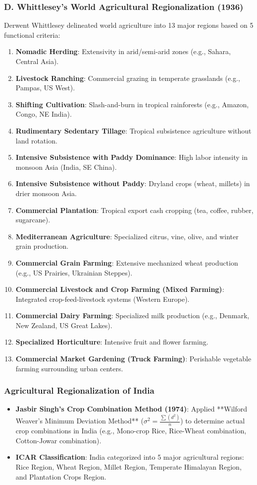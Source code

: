 \documentclass[11pt,a4paper]{article}
\begin{document}
\subsubsection{D. Whittlesey's World Agricultural Regionalization (1936)}
Derwent Whittlesey delineated world agriculture into 13 major regions based on 5 functional criteria:
\begin{enumerate}[leftmargin=*]
  \item \textbf{Nomadic Herding}: Extensivity in arid/semi-arid zones (e.g., Sahara, Central Asia).
  \item \textbf{Livestock Ranching}: Commercial grazing in temperate grasslands (e.g., Pampas, US West).
  \item \textbf{Shifting Cultivation}: Slash-and-burn in tropical rainforests (e.g., Amazon, Congo, NE India).
  \item \textbf{Rudimentary Sedentary Tillage}: Tropical subsistence agriculture without land rotation.
  \item \textbf{Intensive Subsistence with Paddy Dominance}: High labor intensity in monsoon Asia (India, SE China).
  \item \textbf{Intensive Subsistence without Paddy}: Dryland crops (wheat, millets) in drier monsoon Asia.
  \item \textbf{Commercial Plantation}: Tropical export cash cropping (tea, coffee, rubber, sugarcane).
  \item \textbf{Mediterranean Agriculture}: Specialized citrus, vine, olive, and winter grain production.
  \item \textbf{Commercial Grain Farming}: Extensive mechanized wheat production (e.g., US Prairies, Ukrainian Steppes).
  \item \textbf{Commercial Livestock and Crop Farming (Mixed Farming)}: Integrated crop-feed-livestock systems (Western Europe).
  \item \textbf{Commercial Dairy Farming}: Specialized milk production (e.g., Denmark, New Zealand, US Great Lakes).
  \item \textbf{Specialized Horticulture}: Intensive fruit and flower farming.
  \item \textbf{Commercial Market Gardening (Truck Farming)}: Perishable vegetable farming surrounding urban centers.
\end{enumerate}

\subsubsection{Agricultural Regionalization of India}
\begin{itemize}[leftmargin=*]
  \item \textbf{Jasbir Singh's Crop Combination Method (1974)}: Applied **Wilford Weaver's Minimum Deviation Method** ($\sigma^2 = \frac{\sum (d^2)}{n}$) to determine actual crop combinations in India (e.g., Mono-crop Rice, Rice-Wheat combination, Cotton-Jowar combination).
  \item \textbf{ICAR Classification}: India categorized into 5 major agricultural regions: Rice Region, Wheat Region, Millet Region, Temperate Himalayan Region, and Plantation Crops Region.
\end{itemize}
\end{document}
